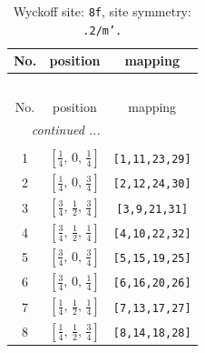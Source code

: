 \documentclass[fleqn,8pt]{jsarticle}
\begin{document}
\begin{longtable}{ccc}
\caption{Wyckoff site: {\tt 8f}, site symmetry: {\tt .2/m'.}}
 \\
 \hline \hline
No. & position & mapping \\ \hline \endfirsthead

\multicolumn{2}{l}{\tablename\ \thetable{}} \\
 \hline \hline
No. & position & mapping \\ \hline \endhead

 \hline \hline
\multicolumn{2}{r}{\footnotesize\it continued ...} \\ \endfoot

 \hline \hline
\multicolumn{2}{r}{} \\ \endlastfoot

1 & $\left[ \frac{1}{4},\, 0,\, \frac{1}{4} \right]$ & {\tt [1,11,23,29]} \\ \hline
2 & $\left[ \frac{1}{4},\, 0,\, \frac{3}{4} \right]$ & {\tt [2,12,24,30]} \\ \hline
3 & $\left[ \frac{3}{4},\, \frac{1}{2},\, \frac{3}{4} \right]$ & {\tt [3,9,21,31]} \\ \hline
4 & $\left[ \frac{3}{4},\, \frac{1}{2},\, \frac{1}{4} \right]$ & {\tt [4,10,22,32]} \\ \hline
5 & $\left[ \frac{3}{4},\, 0,\, \frac{3}{4} \right]$ & {\tt [5,15,19,25]} \\ \hline
6 & $\left[ \frac{3}{4},\, 0,\, \frac{1}{4} \right]$ & {\tt [6,16,20,26]} \\ \hline
7 & $\left[ \frac{1}{4},\, \frac{1}{2},\, \frac{1}{4} \right]$ & {\tt [7,13,17,27]} \\ \hline
8 & $\left[ \frac{1}{4},\, \frac{1}{2},\, \frac{3}{4} \right]$ & {\tt [8,14,18,28]} \\
\end{longtable}
\renewcommand{\arraystretch}{1.2}
\end{document}
